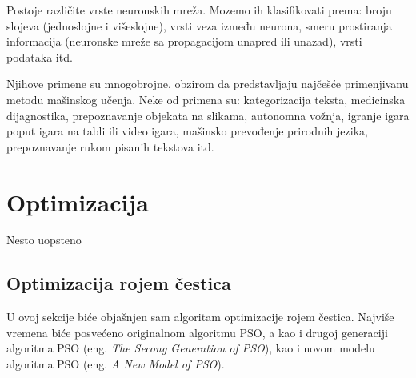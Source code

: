\documentclass[a4paper]{article}
\begin{document}
{Postoje različite vrste neuronskih mreža. Mozemo ih klasifikovati prema: broju slojeva (jednoslojne i višeslojne), vrsti veza između neurona, smeru
prostiranja informacija (neuronske mreže sa propagacijom unapred ili unazad), vrsti podataka itd. 

Njihove primene su mnogobrojne, obzirom da predstavljaju najčešće primenjivanu metodu mašinskog učenja. Neke od primena su: kategorizacija teksta,
medicinska dijagnostika, prepoznavanje objekata na slikama, autonomna vožnja, igranje igara poput igara na tabli ili video igara, mašinsko prevođenje
prirodnih jezika, prepoznavanje rukom pisanih tekstova itd. 



\section{Optimizacija}
\label{optimizacija}

Nesto uopsteno

\subsection{Optimizacija rojem čestica}
\label{subsec:pso}
U ovoj sekcije biće objašnjen sam algoritam optimizacije rojem čestica. Najviše vremena biće posvećeno originalnom algoritmu PSO, a kao i drugoj generaciji algoritma PSO (eng. \textit{The Secong Generation of PSO}), kao i novom modelu algoritma PSO 
(eng. \textit{A New Model of PSO}).


}
\end{document}
